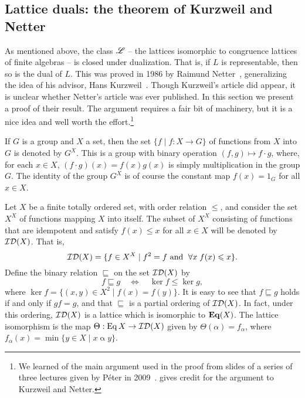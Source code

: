 \subsection{Lattice duals: the theorem of Kurzweil and Netter}
\label{sec:duals-interv-subl-detail}
As mentioned above, 
the class $\mathscr{L}$ -- the lattices isomorphic to congruence lattices of finite
algebras -- is closed under
dualization.
That is, if $L$ is representable, then so is the dual of $L$. This was proved in
1986 by Raimund Netter~\cite{Netter:1986}, generalizing the idea of his advisor,
Hans Kurzweil~\cite{Kurzweil:1985}. 
Though Kurzweil's article did appear,
it is unclear whether Netter's
article was ever published.
In this section we present a proof of their result.
The argument requires a fair bit of machinery, but it is a nice idea and
well worth the effort.\footnote{We learned 
  of the main argument used in the proof from slides of a series of three
  lectures given by P{\'e}ter \Palfy in 2009~\cite{Palfy:2009}.
  \Palfy gives credit for the argument to Kurzweil and Netter.} 

If $G$ is a group and $X$ a set, then the set $\{f \mid f:X\rightarrow G\}$ of 
functions from $X$ into $G$ is denoted by $G^X$.  This is a group with binary
operation $(f,g) \mapsto f\cdot g$, where,  
for each $x\in X$, $(f\cdot g)(x)= f(x)g(x)$ is simply multiplication
in the group $G$.  The identity of the group $G^X$ is of course the constant map $f(x) =
1_G$ for all $x\in X$.

Let $X$ be a finite totally ordered set, with order relation $\leq$,
and consider the set $X^X$ of functions mapping $X$ into itself.  
The subset of $X^X$ consisting of functions that are idempotent and
satisfy %
$f(x) \leq x$ for all $x\in X$
will be denoted by $\mathcal{ID}(X)$.  That is,
\[
\mathcal{ID}(X) = \{f\in X^X \mid f^2 = f \text{ and }\; \forall x\; f(x) \leqslant x\}.
\]
Define the binary relation $\sqsubseteq$ on the set $\mathcal{ID}(X)$ by
\begin{equation}
  \label{eq:MID111}
  f\sqsubseteq g \quad \Leftrightarrow \quad \ker f \leq \ker g,
\end{equation}
where $\ker f = \{(x,y) \in X^2 \mid f(x) = f(y)\}$.
It is easy to see that $f\sqsubseteq g$ holds if and only if $gf = g$, and that
$\sqsubseteq$ is a partial ordering of $\mathcal{ID}(X)$.  
In fact, under this ordering, $\mathcal{ID}(X)$ is a lattice which is 
isomorphic to $\mathbf{Eq}(X)$. The lattice isomorphism is the map
$\Theta : \operatorname{Eq} X \rightarrow \mathcal{ID}(X)$ given by
$\Theta(\alpha) = f_\alpha$, where
$f_\alpha(x) = \min\{y\in X \mid x \mathrel{\alpha} y\}$.



